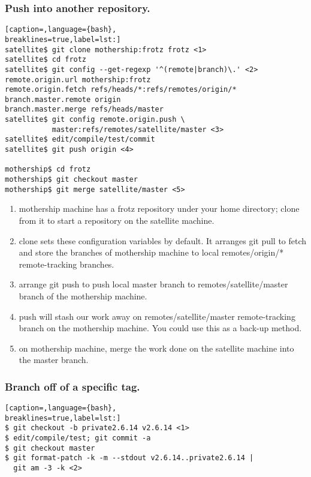 \subsubsection{Push into another repository.}
\lstset{basicstyle=\scriptsize, numbers=none, captionpos=b, tabsize=4}
\begin{lstlisting}[caption=,language={bash},
breaklines=true,label=lst:]
satellite$ git clone mothership:frotz frotz <1>
satellite$ cd frotz
satellite$ git config --get-regexp '^(remote|branch)\.' <2>
remote.origin.url mothership:frotz
remote.origin.fetch refs/heads/*:refs/remotes/origin/*
branch.master.remote origin
branch.master.merge refs/heads/master
satellite$ git config remote.origin.push \
           master:refs/remotes/satellite/master <3>
satellite$ edit/compile/test/commit
satellite$ git push origin <4>

mothership$ cd frotz
mothership$ git checkout master
mothership$ git merge satellite/master <5>
\end{lstlisting}

\begin{enumerate}
\setlength{\itemsep}{0cm}
\setlength{\parskip}{0cm}
\item mothership machine has a frotz repository under your home directory;
clone from it to start a repository on the satellite machine.
\item clone sets these configuration variables by default. It arranges git pull
to fetch and store the branches of mothership machine to local remotes/origin/*
remote-tracking branches.
\item arrange git push to push local master branch to remotes/satellite/master
branch of the mothership machine.
\item push will stash our work away on remotes/satellite/master remote-tracking
branch on the mothership machine. You could use this as a back-up method.
\item on mothership machine, merge the work done on the satellite machine into
the master branch.
\end{enumerate}

\subsubsection{Branch off of a specific tag.}
\lstset{basicstyle=\scriptsize, numbers=none, captionpos=b, tabsize=4}
\begin{lstlisting}[caption=,language={bash},
breaklines=true,label=lst:]
$ git checkout -b private2.6.14 v2.6.14 <1>
$ edit/compile/test; git commit -a
$ git checkout master
$ git format-patch -k -m --stdout v2.6.14..private2.6.14 |
  git am -3 -k <2>
\end{lstlisting}


